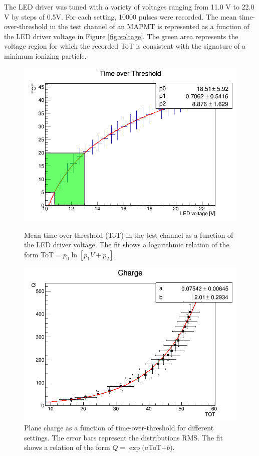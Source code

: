 \documentclass[a4paper,11pt]{article}
\begin{document}
The LED driver was tuned with a variety of voltages ranging from 11.0 V to 22.0 V by steps of 0.5V. For
each setting, 10000 pulses were recorded. The mean time-over-threshold in the test channel of an MAPMT is represented as a function of the LED driver voltage in Figure
\ref{fig:voltage}. The green area represents the voltage region for which the recorded ToT is consistent with the signature of a minimum ionizing particle.

\begin{figure}[htr!]
  \begin{minipage}[b]{.48\textwidth}
   \centering
   \includegraphics[width=\textwidth]{settings.png}
   \caption{Mean time-over-threshold (ToT) in the test channel as a function of the LED driver voltage. The fit shows a logarithmic relation of the form ToT$=p_0\ln\left[p_1V+p_2\right]$.}
   \label{fig:voltage}
  \end{minipage}
  \hfill
  \begin{minipage}[b]{.48\textwidth}
   \centering
   \includegraphics[width=\textwidth]{qvstot.png}
   \caption{Plane charge as a function of time-over-threshold for different settings. The error bars represent the distributions RMS. The fit shows a relation of the form $Q=\exp(a$ToT$+b)$.}
   \label{fig:charge_tot}
   \end{minipage}
\end{figure}
\end{document}
